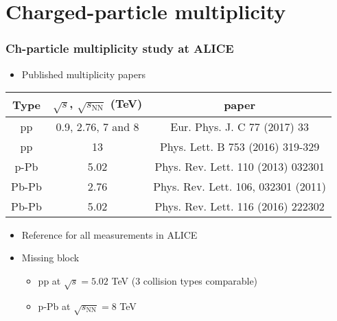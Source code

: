 
\section{Charged-particle multiplicity}



\begin{frame}
\frametitle{Ch-particle multiplicity study at ALICE}
\begin{itemize}
	\item{Published multiplicity papers}
\end{itemize}
\begin{table}[htp]
\begin{center}
\begin{tabular}{|c|c|c|}
\hline
Type & $\sqrt{s}$, $\sqrt{s_\mathrm{NN}}$ (TeV) & paper\\
\hline
pp & 0.9, 2.76, 7 and 8 & Eur. Phys. J. C 77 (2017) 33\\
pp & 13 & Phys. Lett. B 753 (2016) 319-329 \\
\hline
p-Pb & 5.02 & Phys. Rev. Lett. 110 (2013) 032301 \\
\hline
Pb-Pb & 2.76 & Phys. Rev. Lett. 106, 032301 (2011) \\
Pb-Pb & 5.02 & Phys. Rev. Lett. 116 (2016) 222302 \\
\hline
\end{tabular}
\end{center}
\label{default}
\end{table}%

\begin{itemize}
	\item{Reference for all measurements in ALICE}
\end{itemize}
\begin{itemize}
	\item{Missing block}
	\begin{itemize}
		\item{pp at $\sqrt{s} = 5.02$ TeV (3 collision types comparable)}
		\item{p-Pb at $\sqrt{s_\mathrm{NN}} = 8$ TeV}
	\end{itemize}
	
\end{itemize}
\end{frame}

